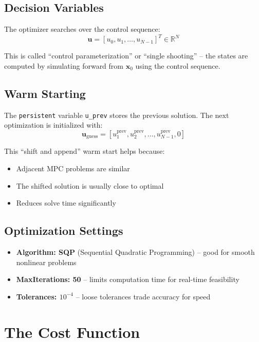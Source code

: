 \documentclass[11pt]{article}
\begin{document}
\subsection{Decision Variables}

The optimizer searches over the control sequence:
\[
\mathbf{u} = [u_0, u_1, \ldots, u_{N-1}]^T \in \mathbb{R}^N
\]

This is called ``control parameterization'' or ``single shooting'' -- the states are computed by simulating forward from $\mathbf{x}_0$ using the control sequence.

\subsection{Warm Starting}

The \texttt{persistent} variable \texttt{u\_prev} stores the previous solution. The next optimization is initialized with:
\[
\mathbf{u}_{\text{guess}} = [u_1^{\text{prev}}, u_2^{\text{prev}}, \ldots, u_{N-1}^{\text{prev}}, 0]
\]

This ``shift and append'' warm start helps because:
\begin{itemize}
    \item Adjacent MPC problems are similar
    \item The shifted solution is usually close to optimal
    \item Reduces solve time significantly
\end{itemize}

\subsection{Optimization Settings}

\begin{itemize}
    \item \textbf{Algorithm: SQP} (Sequential Quadratic Programming) -- good for smooth nonlinear problems
    \item \textbf{MaxIterations: 50} -- limits computation time for real-time feasibility
    \item \textbf{Tolerances: $10^{-4}$} -- loose tolerances trade accuracy for speed
\end{itemize}

\section{The Cost Function}
\end{document}
